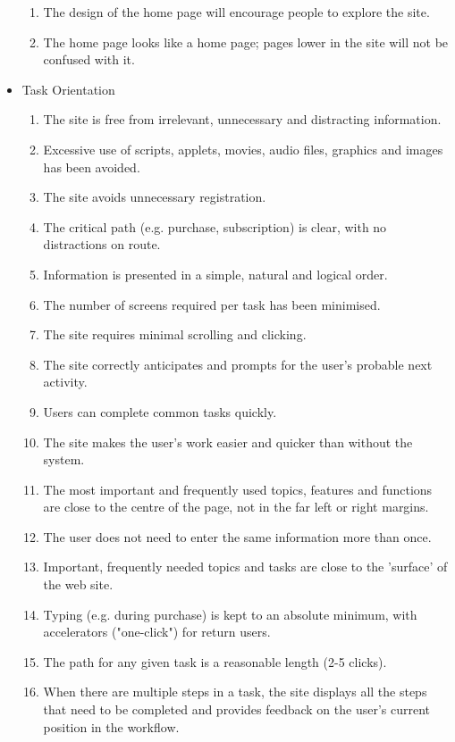 \begin{itemize}
\begin{enumerate}
        \item The design of the home page will encourage people to explore the site.
        \item The home page looks like a home page; pages lower in the site will not be confused with it.
      \end{enumerate}
  \item Task Orientation
      \begin{enumerate}
        \item The site is free from irrelevant, unnecessary and distracting information.
        \item Excessive use of scripts, applets, movies, audio files, graphics and images has been avoided.
        \item The site avoids unnecessary registration.
        \item The critical path (e.g. purchase, subscription) is clear, with no distractions on route.
        \item Information is presented in a simple, natural and logical order.
        \item The number of screens required per task has been minimised.
        \item The site requires minimal scrolling and clicking.
        \item The site correctly anticipates and prompts for the user’s probable next activity.
        \item Users can complete common tasks quickly.
        \item The site makes the user’s work easier and quicker than without the system.
        \item The most important and frequently used topics, features and functions are close to the centre of the page, not in the far left or right margins.
        \item The user does not need to enter the same information more than once.
        \item Important, frequently needed topics and tasks are close to the 'surface' of the web site.
        \item Typing (e.g. during purchase) is kept to an absolute minimum, with accelerators ("one-click") for return users.
        \item The path for any given task is a reasonable length (2-5 clicks).
        \item When there are multiple steps in a task, the site displays all the steps that need to be completed and provides feedback on the user’s current position in the workflow.

\end{enumerate}
\end{itemize}
